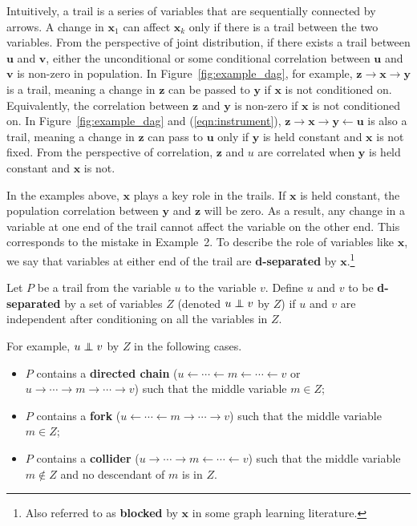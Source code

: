 \documentclass[11pt,review,authoryear]{elsarticle}
\begin{document}
Intuitively, a trail is a series of variables that are sequentially connected by arrows. A change in $\mathbf{x}_1$ can affect $\mathbf{x}_k$ only if there is a trail between the two variables. From the perspective of joint distribution, if there exists a trail between $\mathbf{u}$ and $\mathbf{v}$, either the unconditional or some conditional correlation between $\mathbf{u}$ and $\mathbf{v}$ is non-zero in population. In Figure~\ref{fig:example_dag}, for example, $\mathbf{z} \rightarrow \mathbf{x} \rightarrow \mathbf{y}$ is a trail, meaning a change in $\mathbf{z}$ can be passed to $\mathbf{y}$ if $\mathbf{x}$ is not conditioned on. Equivalently, the correlation between $\mathbf{z}$ and $\mathbf{y}$ is non-zero if  $\mathbf{x}$ is not conditioned on. In Figure~\ref{fig:example_dag} and (\ref{eqn:instrument}), $\mathbf{z} \rightarrow \mathbf{x} \rightarrow \mathbf{y} \leftarrow \mathbf{u}$ is also a trail, meaning a change in $\mathbf{z}$ can pass to $\mathbf{u}$ only if $\mathbf{y}$ is held constant and $\mathbf{x}$ is not fixed. From the perspective of correlation, $\mathbf{z}$ and $u$ are correlated when $\mathbf{y}$ is held constant and $\mathbf{x}$ is not.

In the examples above, $\mathbf{x}$ plays a key role in the trails. If $\mathbf{x}$ is held constant, the population correlation between $\mathbf{y}$ and $\mathbf{z}$ will be zero. As a result, any change in a variable at one end of the trail cannot affect the variable on the other end. This corresponds to the mistake in Example~2. To describe the role of variables like $\mathbf{x}$, we say that variables at either end of the trail are \textbf{d-separated} by $\mathbf{x}$.\footnote{Also referred to as \textbf{blocked} by $\mathbf{x}$ in some graph learning literature.}

\begin{definition}[d-separation]
  \label{def:d_separation}
  Let $P$ be a trail from the variable $u$ to the variable $v$. Define $u$ and $v$ to be \textbf{d-separated} by a set of variables $Z$ (denoted $u \perp\!\!\!\!\perp v$ by $Z$) if $u$ and $v$ are independent after conditioning on all the variables in $Z$.

  For example, $u \perp\!\!\!\!\perp v$ by $Z$ in the following cases.
  \begin{itemize}
    \item $P$ contains a \textbf{directed chain} ($u \leftarrow \cdots \leftarrow m \leftarrow \cdots \leftarrow v$ or $u \rightarrow \cdots \rightarrow m \rightarrow \cdots \rightarrow v$) such that the middle variable $m \in Z$;
    \item $P$ contains a \textbf{fork} ($u \leftarrow \cdots \leftarrow m \rightarrow \cdots \rightarrow v$) such that the middle variable $m \in Z$;
    \item $P$ contains a \textbf{collider} ($u \rightarrow \cdots \rightarrow m \leftarrow \cdots \leftarrow v$) such that the middle variable $m \not\in Z$ and no descendant of $m$ is in $Z$.
  \end{itemize}
\end{definition}
\end{document}

